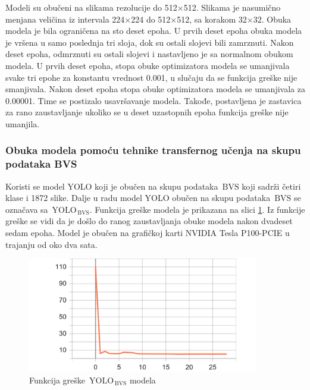 \documentclass[12pt,oneside]{memoir}
\newcommand{\yolo}{\ensuremath{\,\textrm{YOLO}}}
\newcommand{\bvs}{\ensuremath{\,\textrm{BVS}}}
\begin{document}
Modeli su obučeni na slikama rezolucije do 512$\times$512. Slikama je nasumično menjana veličina iz intervala 224$\times$224 do 512$\times$512, sa korakom 32$\times$32. Obuka modela je bila ograničena na sto deset epoha. U prvih deset epoha obuka modela je vršena u samo poslednja tri sloja, dok su ostali slojevi bili zamrznuti. Nakon deset epoha, odmrznuti su ostali slojevi i nastavljeno je sa normalnom obukom modela. U prvih deset epoha, stopa obuke optimizatora modela se umanjivala svake tri epohe za konstantu vrednost 0.001, u slučaju da se funkcija greške nije smanjivala. Nakon deset epoha stopa obuke optimizatora modela se umanjivala za 0.00001. Time se postizalo usavršavanje modela. Takođe, postavljena je zastavica za rano zaustavljanje ukoliko se u deset uzastopnih epoha funkcija greške nije umanjila.


\subsubsection{Obuka modela pomoću tehnike transfernog učenja na skupu podataka BVS}
Koristi se model YOLO koji je obučen na skupu podataka \bvs{} koji sadrži četiri klase i 1872 slike. Dalje u radu model YOLO obučen na skupu podataka \bvs{} se označava sa $\yolo_{\bvs{}}$. Funkcija greške modela je prikazana na slici \ref{fig:section4_yolo4noaug_loss}. Iz funkcije greške se vidi da je došlo do ranog zaustavljanja obuke modela nakon dvadeset sedam epoha. Model je obučen na grafičkoj karti NVIDIA Tesla P100-PCIE  u trajanju od oko dva sata.

\begin{figure}[!ht]
\centering
  \includegraphics[width=0.90\textwidth]{matfmaster/yolo/v4/without_augmentation/epoch_loss.png}
\caption{Funkcija greške $\yolo_{\bvs{}}$ modela}
\label{fig:section4_yolo4noaug_loss}
\end{figure}
\end{document}
